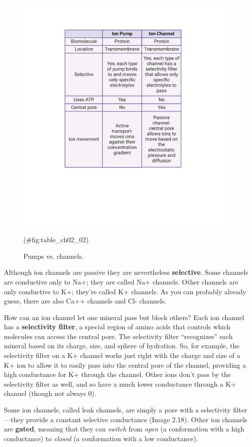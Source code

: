 \documentclass[
]{book}
\begin{document}
\begin{figure}

{\centering \includegraphics[width=0.8\linewidth]{images/ch02/table_02_01} 

}

\caption{Pumps vs. channels.}(\#fig:table_ch02_02)
\end{figure}

Although ion channels are passive they are nevertheless \textbf{selective}. Some channels are conductive only to Na+; they are called Na+ channels. Other channels are only conductive to K+; they're called K+ channels. As you can probably already guess, there are also Ca++ channels and Cl- channels.

How can an ion channel let one mineral pass but block others? Each ion channel has a \textbf{selectivity filter}, a special region of amino acids that controls which molecules can access the central pore. The selectivity filter ``recognizes'' each mineral based on its charge, size, and sphere of hydration. So, for example, the selectivity filter on a K+ channel works just right with the charge and size of a K+ ion to allow it to easily pass into the central pore of the channel, providing a high conductance for K+ through the channel. Other ions don't pass by the selectivity filter as well, and so have a much lower conductance through a K+ channel (though not always 0).

Some ion channels, called leak channels, are simply a pore with a selectivity filter---they provide a constant selective conductance (Image 2.18). Other ion channels are \textbf{gated}, meaning that they can \emph{switch} from \emph{open} (a conformation with a high conductance) to \emph{closed} (a conformation with a low conductance).
\end{document}
